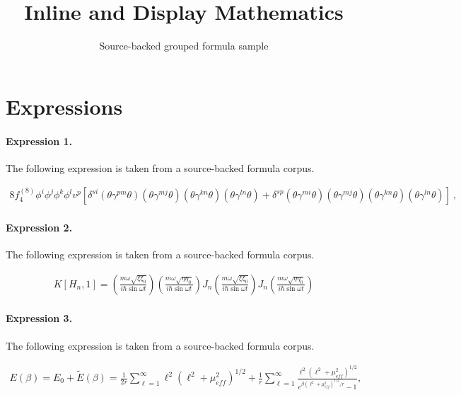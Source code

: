 \documentclass[11pt]{article}
\title{Inline and Display Mathematics}
\author{Source-backed grouped formula sample}
\date{}
\begin{document}
\maketitle
\section{Expressions}
\paragraph{Expression 1.} The following expression is taken from a source-backed formula corpus.

\begin{align*}8 f^{(8)}_4 \phi^i \phi^j \phi^k \phi^l v^p \left[ \delta^{si} (\theta \gamma^{pm} \theta) (\theta \gamma^{mj} \theta)(\theta \gamma^{kn} \theta)(\theta \gamma^{ln} \theta) + \delta^{sp} (\theta \gamma^{mi} \theta)(\theta \gamma^{mj} \theta)(\theta \gamma^{kn} \theta)(\theta \gamma^{ln} \theta)\right] ~,\end{align*}

\paragraph{Expression 2.} The following expression is taken from a source-backed formula corpus.

\begin{align*}K[H_n,1] = \left( \frac{m \omega \sqrt{\xi \xi_0}}{i \hbar \sin\omega t } \right) \left( \frac{m \omega \sqrt{\eta \eta_0}}{i\hbar \sin \omega t}\right) J_n \left( \frac{m \omega \sqrt{\xi \xi_0}}{i \hbar \sin \omega t } \right) J_n \left( \frac{m \omega \sqrt{\eta \eta_0}}{i\hbar \sin \omega t} \right) \end{align*}

\paragraph{Expression 3.} The following expression is taken from a source-backed formula corpus.

\begin{align*}E\left(\beta \right)=E_{0}+\widetilde{E}\left(\beta \right)=\frac{1}{2r}\sum _{\ell =1}^{\infty }\ell ^{2}\left(\ell ^{2}+\mu _{eff}^{2}\right)^{1/2}+\frac{1}{r}\sum _{\ell =1}^{\infty }\frac{\ell ^{2}\left(\ell ^{2}+\mu _{eff}^{2}\right)^{1/2}}{e^{\beta \left(\ell ^{2}+\mu _{eff}^{2}\right)^{1/2}/r}-1},\end{align*}
\end{document}
